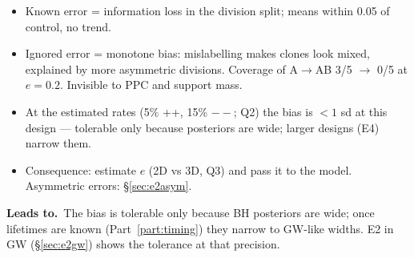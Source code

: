 \documentclass[10pt,a4paper]{article}
\newcommand{\blk}[1]{\par\needspace{5\baselineskip}\smallskip{\sffamily\bfseries\color{inkgray}#1}\par}
\newcommand{\Comment}{\blk{Comment}}
\newcommand{\Leads}[1]{\begin{leadbox}{\sffamily\bfseries\color{caqua!70!black}Leads to.}\ #1\end{leadbox}}
\renewcommand{\blk}[1]{\par\Needspace*{5\baselineskip}\smallskip{\sffamily\bfseries\color{inkgray}#1}\par}
\newcommand{\sref}[1]{\S\ref{#1}}
\begin{document}
\Comment
\begin{itemize}
\item Known error = information loss in the division split; means within 0.05 of control, no trend.
\item Ignored error = monotone bias: mislabelling makes clones look mixed, explained by more asymmetric divisions. Coverage of A$\to$AB 3/5 $\to$ 0/5 at $e=0.2$. Invisible to PPC and support mass.
\item At the estimated rates (5\% ++, 15\% $--$; Q2) the bias is $<1$ sd at this design --- tolerable only because posteriors are wide; larger designs (E4) narrow them.
\item Consequence: estimate $e$ (2D vs 3D, Q3) and pass it to the model. Asymmetric errors: \S\ref{sec:e2asym}.
\end{itemize}
\Leads{The bias is tolerable only because BH posteriors are wide; once lifetimes are known (Part~\ref{part:timing}) they narrow to GW-like widths. E2 in GW (\sref{sec:e2gw}) shows the tolerance at that precision.}
\end{document}
